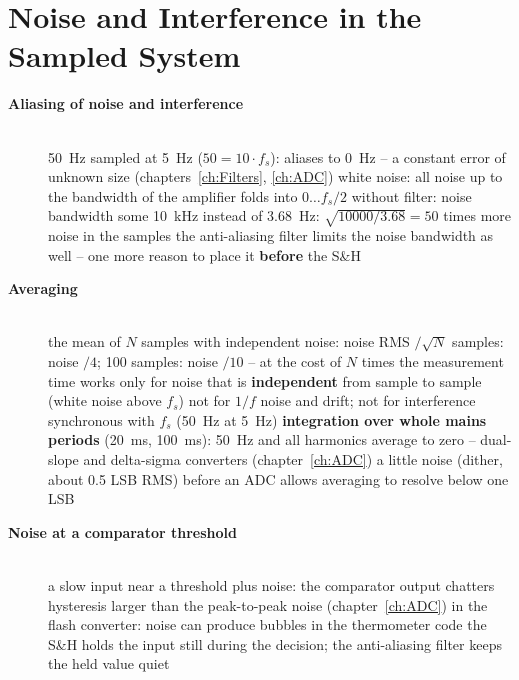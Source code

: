 \section{Noise and Interference in the Sampled System}

\begin{description}
\item[{\rot\bf Aliasing of noise and interference}]~\\[-\lblskip]
\bi
	\ite \SI{50}{\hertz} sampled at \SI{5}{\hertz} ($50 = 10\cdot f_s$): aliases to \SI{0}{\hertz} -- a constant error of unknown size (chapters~\ref{ch:Filters}, \ref{ch:ADC})
	\ite white noise: all noise up to the bandwidth of the amplifier folds into $0 \ldots f_s/2$
	\itee without filter: noise bandwidth some \SI{10}{\kilo\hertz} instead of \SI{3.68}{\hertz}: $\sqrt{10000/3.68} = 50$ times more noise in the samples
	\ite the anti-aliasing filter limits the noise bandwidth as well -- one more reason to place it \textbf{before} the S\&H
\ei
{}\quad{}\par
\os{\newpage}

\item[{\rot\bf Averaging}]~\\[-\lblskip]
\bi
	\ite the mean of $N$ samples with independent noise: noise RMS $/\sqrt{N}$
	 samples: noise $/4$; 100 samples: noise $/10$ -- at the cost of $N$ times the measurement time
	\ite works only for noise that is \textbf{independent} from sample to sample (white noise above $f_s$)
	\itee not for $1/f$ noise and drift; not for interference synchronous with $f_s$ (\SI{50}{\hertz} at \SI{5}{\hertz})
	\ite \textbf{integration over whole mains periods} (\SI{20}{\milli\second}, \SI{100}{\milli\second}): \SI{50}{\hertz} and all harmonics average to zero -- dual-slope and delta-sigma converters (chapter~\ref{ch:ADC})
	\ite a little noise (dither, about 0.5 LSB RMS) before an ADC allows averaging to resolve below one LSB
\ei
\os{\newpage}

\item[{\rot\bf Noise at a comparator threshold}]~\\[-\lblskip]
\bi
	\ite a slow input near a threshold plus noise: the comparator output chatters
	\ite hysteresis larger than the peak-to-peak noise (chapter~\ref{ch:ADC})
	\ite in the flash converter: noise can produce bubbles in the thermometer code
	\ite the S\&H holds the input still during the decision; the anti-aliasing filter keeps the held value quiet
\ei
{}\par
\os{\newpage}
\end{description}

